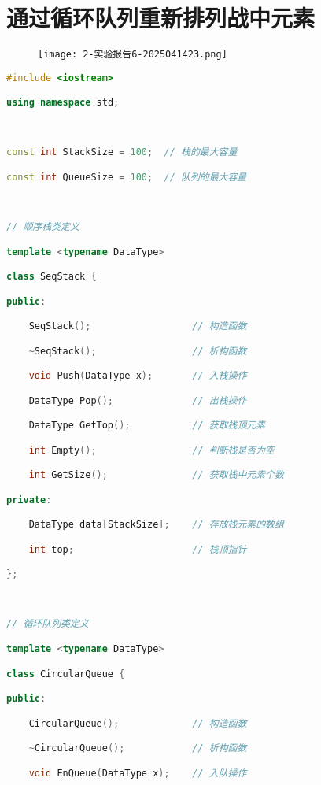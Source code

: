 \section{通过循环队列重新排列战中元素}

\begin{figure}[H]
\centering
\texttt{[image: 2-实验报告6-2025041423.png]}
\label{}
\end{figure}

\begin{lstlisting}[language=C++]
#include <iostream>

using namespace std;

  

const int StackSize = 100;  // 栈的最大容量

const int QueueSize = 100;  // 队列的最大容量

  

// 顺序栈类定义

template <typename DataType>

class SeqStack {

public:

    SeqStack();                  // 构造函数

    ~SeqStack();                 // 析构函数

    void Push(DataType x);       // 入栈操作

    DataType Pop();              // 出栈操作

    DataType GetTop();           // 获取栈顶元素

    int Empty();                 // 判断栈是否为空

    int GetSize();               // 获取栈中元素个数

private:

    DataType data[StackSize];    // 存放栈元素的数组

    int top;                     // 栈顶指针

};

  

// 循环队列类定义

template <typename DataType>

class CircularQueue {

public:

    CircularQueue();             // 构造函数

    ~CircularQueue();            // 析构函数

    void EnQueue(DataType x);    // 入队操作


\end{lstlisting}
